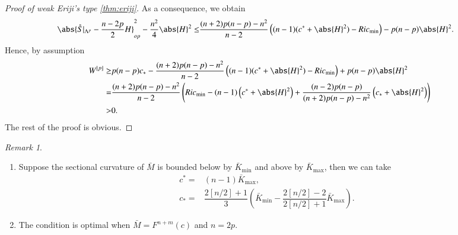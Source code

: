 \documentclass[12pt]{amsart}
\theoremstyle{plain}
\theoremstyle{remark}
\newtheorem{rem}{Remark}[section]
\theoremstyle{definition}
\numberwithin{equation}{section}
\begin{document}
\begin{proof}[Proof of weak Eriji's type \autoref{thm:eriji}]
As a consequence, we obtain
\begin{align*}
\abs{\mathring{S}\vert_{\Lambda^p}-\dfrac{n-2p}{2}H}_{op}^2-\dfrac{n^2}{4}\abs{H}^2\leq&\dfrac{(n+2)p(n-p)-n^2}{n-2}\left((n-1)(c^*+\abs{H}^2)-Ric_{\min}\right)-p(n-p)\abs{H}^2.
\end{align*}
Hence, by assumption
\begin{align*}
W^{[p]}\geq& p(n-p)c_*-\dfrac{(n+2)p(n-p)-n^2}{n-2}\left((n-1)(c^*+\abs{H}^2)-Ric_{\min}\right)+p(n-p)\abs{H}^2\\
=&\dfrac{(n+2)p(n-p)-n^2}{n-2}\left(Ric_{\min}-(n-1)\left(c^*+\abs{H}^2\right)+\dfrac{(n-2)p(n-p)}{(n+2)p(n-p)-n^2}\left(c_*+\abs{H}^2\right)\right)\\
>&0.
\end{align*}
The rest of the proof is obvious.
\end{proof}
\begin{rem}
\begin{enumerate}
\item Suppose the sectional curvature of $\bar M$ is bounded below by $\bar K_{\min}$ and above by $\bar K_{\max}$, then we can take
\begin{align*}
c^*=&(n-1)\bar K_{\max},\\
c_*=&\dfrac{2[n/2]+1}{3}\left(\bar K_{\min}-\dfrac{2[n/2]-2}{2[n/2]+1}\bar K_{\max}\right).
\end{align*}
\item The condition is optimal when $\bar M=F^{n+m}(c)$ and $n=2p$.

\end{enumerate}

\end{rem}

\appendix
\end{document}
